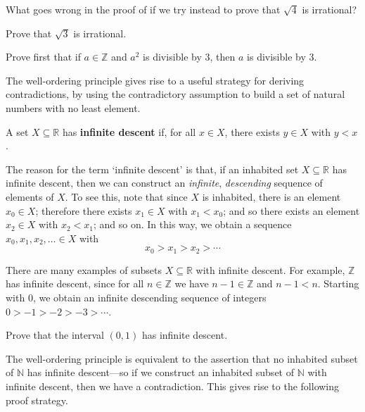 \begin{exercise}
What goes wrong in the proof of  if we try instead to prove that $\sqrt{4}$ is irrational?
\end{exercise}

\begin{exercise}
\label{exSquareRootThreeIsIrrational}
Prove that $\sqrt{3}$ is irrational.
\begin{backhint}
Prove first that if $a \in \mathbb{Z}$ and $a^2$ is divisible by $3$, then $a$ is divisible by $3$.
\end{backhint}
\end{exercise}

The well-ordering principle gives rise to a useful strategy for deriving contradictions, by using the contradictory assumption to build a set of natural numbers with no least element.

\begin{definition}
\label{defInfiniteDescent}
A set $X \subseteq \mathbb{R}$ has \textbf{infinite descent} if, for all $x \in X$, there exists $y \in X$ with $y < x$.
\end{definition}

The reason for the term `infinite descent' is that, if an inhabited set $X \subseteq \mathbb{R}$ has infinite descent, then we can construct an \textit{infinite}, \textit{descending} sequence of elements of $X$. To see this, note that since $X$ is inhabited, there is an element $x_0 \in X$; therefore there exists $x_1 \in X$ with $x_1 < x_0$; and so there exists an element $x_2 \in X$ with $x_2 < x_1$; and so on. In this way, we obtain a sequence $x_0,x_1,x_2,\dots{} \in X$ with
\[ x_0 > x_1 > x_2 > \cdots \]

\begin{example}
There are many examples of subsets $X \subseteq \mathbb{R}$ with infinite descent. For example, $\mathbb{Z}$ has infinite descent, since for all $n \in \mathbb{Z}$ we have $n-1 \in \mathbb{Z}$ and $n-1 < n$. Starting with $0$, we obtain an infinite descending sequence of integers $0 > -1 > -2 > -3 > \cdots$.
\end{example}

\begin{exercise}
Prove that the interval $(0,1)$ has infinite descent.
\end{exercise}

The well-ordering principle is equivalent to the assertion that no inhabited subset of $\mathbb{N}$ has infinite descent---so if we construct an inhabited subset of $\mathbb{N}$ with infinite descent, then we have a contradiction. This gives rise to the following proof strategy.


